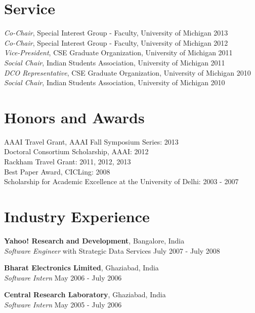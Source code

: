 \documentclass[margin,line,11pt]{res}
\begin{document}
\begin{resume}
\section{\sc Service}
\emph{Co-Chair}, Special Interest Group - Faculty, University of Michigan \hfill 2013 \\
\emph{Co-Chair}, Special Interest Group - Faculty, University of Michigan \hfill 2012 \\
\emph{Vice-President}, CSE Graduate Organization, University of Michigan \hfill 2011 \\
\emph{Social Chair}, Indian Students Association, University of Michigan \hfill 2011\\
\emph{DCO Representative}, CSE Graduate Organization, University of Michigan \hfill 2010 \\
\emph{Social Chair}, Indian Students Association, University of Michigan \hfill 2010

\section{\sc Honors and Awards} 
AAAI Travel Grant, AAAI Fall Symposium Series: 2013\\
Doctoral Consortium Scholarship, AAAI: 2012 \\
Rackham Travel Grant: 2011, 2012, 2013 \\
Best Paper Award, CICLing: 2008 \\
Scholarship for Academic Excellence at the University of Delhi: 2003 - 2007 

\section{\sc Industry Experience}
{\bf Yahoo! Research and Development}, Bangalore, India \\
\emph{Software Engineer} with Strategic Data Services \hfill July 2007 - July 2008

{\bf Bharat Electronics Limited}, Ghaziabad, India \\
\emph{Software Intern} \hfill May 2006 - July 2006 

{\bf Central Research Laboratory}, Ghaziabad, India \\
\emph{Software Intern} \hfill May 2005 - July 2006 


\end{resume}
\end{document}
